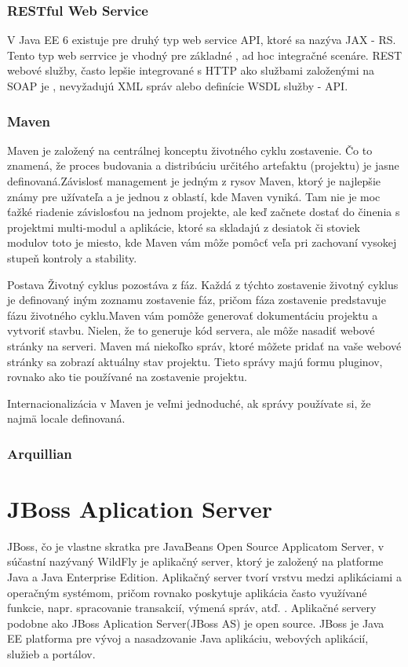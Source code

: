\subsection{RESTful Web Service}
V Java EE 6 existuje pre druhý typ web service API, ktoré sa nazýva JAX - RS. Tento typ web serrvice je vhodný pre základné , ad hoc integračné scenáre. REST webové služby, často lepšie integrované s HTTP ako službami založenými na SOAP je , nevyžadujú XML správ alebo definície WSDL služby - API.

\subsection{Maven}
Maven  je založený na centrálnej konceptu životného cyklu zostavenie. Čo to znamená, že proces budovania a distribúciu určitého artefaktu (projektu) je jasne definovaná.Závislosť management je jedným z rysov Maven, ktorý je najlepšie známy pre užívateľa a je jednou z oblastí, kde Maven vyniká. Tam nie je moc ťažké riadenie závislosťou na jednom projekte, ale keď začnete dostať do činenia s projektmi multi-modul a aplikácie, ktoré sa skladajú z desiatok či stoviek modulov toto je miesto, kde Maven vám môže pomôcť veľa pri zachovaní vysokej stupeň kontroly a stability.

Postava Životný cyklus pozostáva z fáz. Každá z týchto zostavenie životný cyklus je definovaný iným zoznamu zostavenie fáz, pričom fáza zostavenie predstavuje fázu životného cyklu.Maven vám pomôže generovať dokumentáciu projektu a vytvoriť stavbu. Nielen, že to generuje kód servera, ale môže nasadiť webové stránky na serveri. Maven má niekoľko správ, ktoré môžete pridať na vaše webové stránky sa zobrazí aktuálny stav projektu. Tieto správy majú formu pluginov, rovnako ako tie používané na zostavenie projektu.

Internacionalizácia v Maven je veľmi jednoduché, ak správy používate si, že najmä locale definovaná.\cite{mavenbook}

\subsection{Arquillian}


\chapter{JBoss Aplication Server} 
JBoss, čo je vlastne skratka pre JavaBeans Open Source Applicatom Server, v súčastní nazývaný WildFly je aplikačný server, ktorý je založený na platforme Java a Java Enterprise Edition.\cite{jbossbook} Aplikačný server tvorí vrstvu medzi aplikáciami a operačným systémom, pričom rovnako poskytuje aplikácia často využívané funkcie, napr. spracovanie transakcií, výmená správ, atď. . Aplikačné servery podobne ako JBoss Aplication Server(JBoss AS) je open source. JBoss je Java EE platforma pre vývoj a nasadzovanie Java aplikáciu, webových aplikácií, služieb a portálov.

